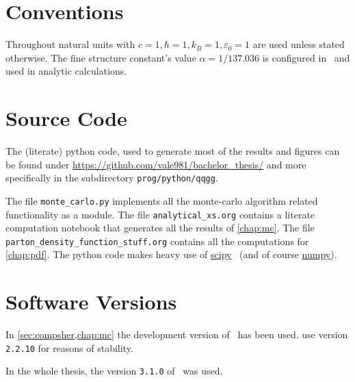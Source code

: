 \section{Conventions}%
\label{sec:convent}

Throughout natural units with
\(c=1, \hbar = 1, k_B=1, \varepsilon_0 = 1\) are used unless stated
otherwise. The fine structure constant's value \(\alpha = 1/137.036\)
is configured in \sherpa\ and used in analytic calculations.

\section{Source Code}%
\label{sec:source}

The (literate) python code, used to generate most of the results and
figures can be found under
\url{https://github.com/vale981/bachelor_thesis/} and more
specifically in the subdirectory \texttt{prog/python/qqgg}.

The file \texttt{monte\_carlo.py} implements all the monte-carlo
algorithm related functionality as a module. The file
\texttt{analytical\_xs.org} contains a literate computation notebook
that generates all the results of \cref{chap:mc}. The file
\texttt{parton\_density\_function\_stuff.org} contains all the
computations for \cref{chap:pdf}. The python code makes heavy use of
\href{https://www.scipy.org/}{scipy}~\cite{2020Virtanen:Sc} (and of
course \href{https://numpy.org/}{numpy}).

\section{Software Versions}%
\label{sec:versions}

In \cref{sec:compsher,chap:mc} the development version of \sherpa\ has
been used.  use version \texttt{2.2.10} for
reasons of stability.

In the whole thesis, the version \texttt{3.1.0} of \rivet\ was used.

